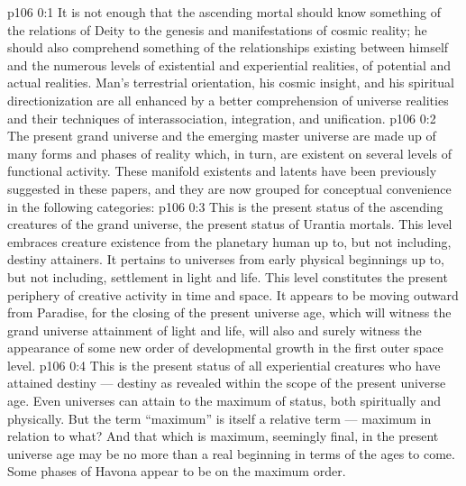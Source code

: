 \author{Melchizedek}
\vs p106 0:1 It is not enough that the ascending mortal should know something of the relations of Deity to the genesis and manifestations of cosmic reality; he should also comprehend something of the relationships existing between himself and the numerous levels of existential and experiential realities, of potential and actual realities. Man’s terrestrial orientation, his cosmic insight, and his spiritual directionization are all enhanced by a better comprehension of universe realities and their techniques of interassociation, integration, and unification.
\vs p106 0:2 The present grand universe and the emerging master universe are made up of many forms and phases of reality which, in turn, are existent on several levels of functional activity. These manifold existents and latents have been previously suggested in these papers, and they are now grouped for conceptual convenience in the following categories:
\vs p106 0:3 \bibnobreakspace {} This is the present status of the ascending creatures of the grand universe, the present status of Urantia mortals. This level embraces creature existence from the planetary human up to, but not including, destiny attainers. It pertains to universes from early physical beginnings up to, but not including, settlement in light and life. This level constitutes the present periphery of creative activity in time and space. It appears to be moving outward from Paradise, for the closing of the present universe age, which will witness the grand universe attainment of light and life, will also and surely witness the appearance of some new order of developmental growth in the first outer space level.
\vs p106 0:4 \bibnobreakspace {} This is the present status of all experiential creatures who have attained destiny --- destiny as revealed within the scope of the present universe age. Even universes can attain to the maximum of status, both spiritually and physically. But the term “maximum” is itself a relative term --- maximum in relation to what? And that which is maximum, seemingly final, in the present universe age may be no more than a real beginning in terms of the ages to come. Some phases of Havona appear to be on the maximum order.
